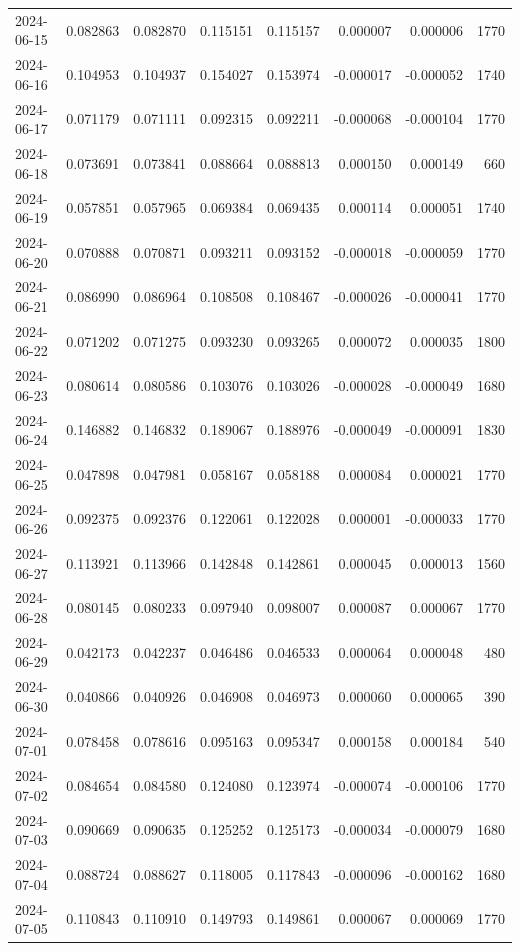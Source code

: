\begin{tabular}{lrrrrrrr}
2024-06-15 & 0.082863 & 0.082870 & 0.115151 & 0.115157 & 0.000007 & 0.000006 & 1770 \\
2024-06-16 & 0.104953 & 0.104937 & 0.154027 & 0.153974 & -0.000017 & -0.000052 & 1740 \\
2024-06-17 & 0.071179 & 0.071111 & 0.092315 & 0.092211 & -0.000068 & -0.000104 & 1770 \\
2024-06-18 & 0.073691 & 0.073841 & 0.088664 & 0.088813 & 0.000150 & 0.000149 & 660 \\
2024-06-19 & 0.057851 & 0.057965 & 0.069384 & 0.069435 & 0.000114 & 0.000051 & 1740 \\
2024-06-20 & 0.070888 & 0.070871 & 0.093211 & 0.093152 & -0.000018 & -0.000059 & 1770 \\
2024-06-21 & 0.086990 & 0.086964 & 0.108508 & 0.108467 & -0.000026 & -0.000041 & 1770 \\
2024-06-22 & 0.071202 & 0.071275 & 0.093230 & 0.093265 & 0.000072 & 0.000035 & 1800 \\
2024-06-23 & 0.080614 & 0.080586 & 0.103076 & 0.103026 & -0.000028 & -0.000049 & 1680 \\
2024-06-24 & 0.146882 & 0.146832 & 0.189067 & 0.188976 & -0.000049 & -0.000091 & 1830 \\
2024-06-25 & 0.047898 & 0.047981 & 0.058167 & 0.058188 & 0.000084 & 0.000021 & 1770 \\
2024-06-26 & 0.092375 & 0.092376 & 0.122061 & 0.122028 & 0.000001 & -0.000033 & 1770 \\
2024-06-27 & 0.113921 & 0.113966 & 0.142848 & 0.142861 & 0.000045 & 0.000013 & 1560 \\
2024-06-28 & 0.080145 & 0.080233 & 0.097940 & 0.098007 & 0.000087 & 0.000067 & 1770 \\
2024-06-29 & 0.042173 & 0.042237 & 0.046486 & 0.046533 & 0.000064 & 0.000048 & 480 \\
2024-06-30 & 0.040866 & 0.040926 & 0.046908 & 0.046973 & 0.000060 & 0.000065 & 390 \\
2024-07-01 & 0.078458 & 0.078616 & 0.095163 & 0.095347 & 0.000158 & 0.000184 & 540 \\
2024-07-02 & 0.084654 & 0.084580 & 0.124080 & 0.123974 & -0.000074 & -0.000106 & 1770 \\
2024-07-03 & 0.090669 & 0.090635 & 0.125252 & 0.125173 & -0.000034 & -0.000079 & 1680 \\
2024-07-04 & 0.088724 & 0.088627 & 0.118005 & 0.117843 & -0.000096 & -0.000162 & 1680 \\
2024-07-05 & 0.110843 & 0.110910 & 0.149793 & 0.149861 & 0.000067 & 0.000069 & 1770 \\

\end{tabular}
